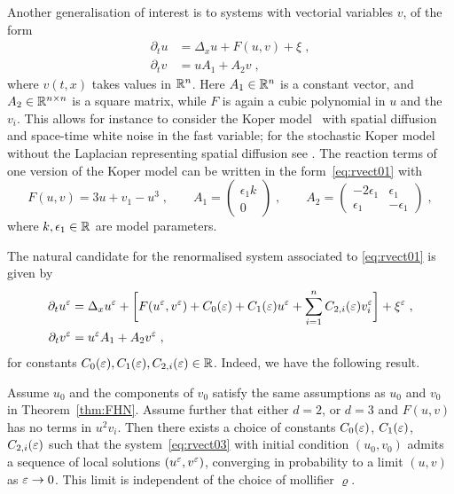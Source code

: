 \documentclass[reqno,11pt]{article}
\begin{document}
Another generalisation of interest is to systems with vectorial variables $v$,
of the form 
\begin{align}
\nonumber
\partial_t u &= \Delta_x u + F(u,v) + \xi\;, \\
\partial_t v &= u A_1 + A_2 v\;,
\label{eq:rvect01} 
\end{align}
where $v(t,x)$ takes values in $\mathbb{R}^n$. Here $A_1\in\mathbb{R}^n$ is a constant vector,
and $A_2\in\mathbb{R}^{n\times n}$ is a square matrix, while $F$ is again a cubic
polynomial in $u$ and the $v_i$. This allows for instance to consider the Koper
model~\cite{Koper} with spatial diffusion and space-time white noise in the fast
variable; for the stochastic Koper model without the Laplacian representing
spatial diffusion see \cite{BerglundGentzKuehn1}. The reaction terms of one
version of the Koper model can be written in the form~\eqref{eq:rvect01} with 
\begin{equation}
 \label{eq:rvect02}
 F(u,v) = 3u + v_1 - u^3\;, 
 \qquad
 A_1 = 
 \begin{pmatrix}
 \epsilon_1k \\ 0 
 \end{pmatrix}\;, 
 \qquad
 A_2 = 
 \begin{pmatrix}
 -2\epsilon_1 & \epsilon_1 \\ \epsilon_1 & -\epsilon_1
 \end{pmatrix}\;,
\end{equation} 
where $k, \epsilon_1\in\mathbb{R}$ are model parameters. 

The natural candidate for the renormalised system associated to
\eqref{eq:rvect01} is given by 
\begin{align}
\nonumber
\partial_t u^\eps &= \Delta_x u^\eps + \biggbrak{F(u^\eps,v^\eps) +
C_0(\eps) + C_1(\eps) u^\eps + \sum_{i=1}^nC_{2,i}(\eps) v_i^\eps} +
\xi^\eps\;, \\
\partial_t v^\eps &= u^\eps A_1 + A_2 v^\eps\;, 
\label{eq:rvect03} 
\end{align}
for constants $C_0(\varepsilon), C_1(\varepsilon), C_{2,i}(\varepsilon) \in\mathbb{R}$. 
Indeed, we have the following result.

\begin{theorem}
\label{thm:vectorial}
Assume $u_0$ and the components of $v_0$ satisfy the same assumptions as $u_0$
and $v_0$ in Theorem~\ref{thm:FHN}. Assume further that either $d=2$, or $d=3$
and $F(u,v)$ has no terms in $u^2v_i$. Then there exists a choice of constants
$C_0(\varepsilon)$, $C_1(\varepsilon)$, $C_{2,i}(\varepsilon)$ such that the
system~\eqref{eq:rvect03} with initial condition $(u_0,v_0)$ admits a sequence
of local solutions $(u^\varepsilon,v^\varepsilon)$, converging in probability to a limit
$(u,v)$ as $\varepsilon\to0$. This limit is independent of the choice of mollifier
$\varrho$.  
\end{theorem}
\end{document}
